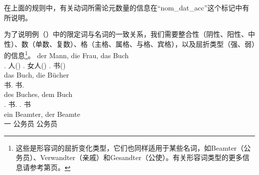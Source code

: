 \zl
在上面的规则中，有关动词所需论元数量的信息在“nom\_dat\_acc”这个标记中有所说明。

为了说明例（）中的限定词与名词的一致关系，我们需要整合性（阴性、阳性、中性）、数（单数、复数）、格（主格、属格、与格、宾格），以及屈折类型（强、弱）的信息\footnote{%
这些是形容词的屈折变化类型，它们也同样适用于某些名词，如Beamter（公务员）、Verwandter（亲戚）和Gesandter（公使）。有关形容词类型的更多信息请参考第\pageref{page-Flexionsklasse-Wunderlich}页。
}。
\eal\settowidth{}
\ex 
\gll der Mann, die Frau, das Buch\\
	 .\mas{} 人(\mas) .\fem{} 女人(\fem) .\neu{} 书(\neu)\\
\ex 
\gll das Buch, die Bücher\\
	  书.\sg{}  书.\pl\\
\ex 
\gll des Buches, dem Buch\\
	 .\gen{} 书.\gen{} .\dat{} 书\\
\ex{} 
\gll ein Beamter, der Beamte\\
	 一 公务员  公务员\\
